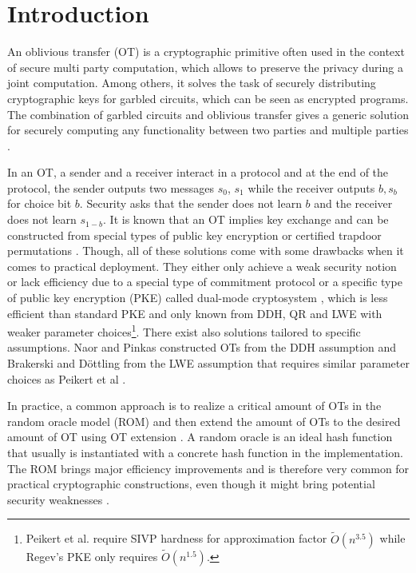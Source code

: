 \newcommand{\msng}{\textcolor{red}{(Missing References?)}}

\section{Introduction}

An oblivious transfer (OT) \cite{Rabin81,C:EveGolLem82} is a cryptographic primitive often used in the context of secure multi party computation, which allows to preserve the privacy during a joint computation. Among others, it solves the task of securely distributing cryptographic keys for garbled circuits, which can be seen as encrypted programs. The combination of garbled circuits and oblivious transfer gives a generic solution for securely computing any functionality between two parties \cite{FOCS:Yao82b,FOCS:Yao86,STOC:Kilian88,C:IshPraSah08} and multiple parties \cite{C:CreVanTap95,EC:BenLin18,EC:GarSri18a}.   

In an OT, a sender and a receiver interact in a protocol and at the end of the protocol, the sender outputs two messages $s_0$, $s_1$ while the receiver outputs $b, s_b$ for choice bit $b$. Security asks that the sender does not learn $b$ and the receiver does not learn $s_{1-b}$. It is known that an OT implies key exchange and can be constructed from special types of public key encryption \cite{FOCS:GKMRV00,C:PeiVaiWat08,cryptoeprint:2018:473} or certified trapdoor permutations \cite{C:OstRicSca15}. Though, all of these solutions come with some drawbacks when it comes to practical deployment. They either only achieve a weak security notion \cite{FOCS:GKMRV00} or lack efficiency due to a special type of commitment protocol \cite{STOC:Kilian92,C:OstRicSca15,cryptoeprint:2018:473} or a specific type of public key encryption (PKE) called dual-mode cryptosystem \cite{C:PeiVaiWat08}, which is less efficient than standard PKE and only known from DDH, QR and LWE with weaker parameter choices\footnote{Peikert et al. require SIVP hardness for approximation factor $\tilde{O}(n^{3.5})$ while Regev's PKE \cite{STOC:Regev05} only requires $\tilde{O}(n^{1.5})$.}. There exist also solutions tailored to specific assumptions. Naor and Pinkas \cite{SODA:NaoPin01} constructed OTs from the DDH assumption and Brakerski and D\"ottling \cite{TCC:BraDot18} from the LWE assumption that requires similar parameter choices as Peikert et al \cite{C:PeiVaiWat08}.

In practice, a common approach is to realize a critical amount of OTs in the random oracle model (ROM) \cite{CCS:BelRog93,SODA:NaoPin01} and then extend the amount of OTs to the desired amount of OT using OT extension \cite{STOC:Beaver96a,C:IKNP03,RSA:OrrOrsSch17,EC:ALSZ15,C:KelOrsSch15}. A random oracle is an ideal hash function that usually is instantiated with a concrete hash function in the implementation. The ROM brings major efficiency improvements and is therefore very common for practical cryptographic constructions, even though it might bring potential security weaknesses \cite{STOC:CanGolHal98}. 

